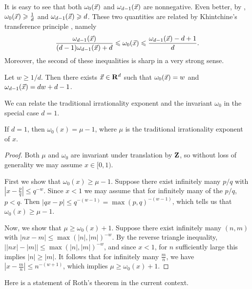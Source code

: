 It is easy to see that both $\omega_0(\vec{x})$ and $\omega_{d-1}(\vec{x})$ are 
nonnegative. Even better, by \cite[Th.~2 Cor]{laurent-2009}, 
$\omega_0(\vec{x}) \geqslant \frac 1 d$ and $\omega_{d-1}(\vec{x}) \geqslant d$. 
These two quantities are related by Khintchine's transference 
principle \cite[Th.~2]{laurent-2009}, namely 
\[
	\frac{\omega_{d-1}(\vec{x})}{(d-1) \omega_{d-1}(\vec{x})+d} \leqslant \omega_0(\vec{x}) \leqslant \frac{\omega_{d-1}(\vec{x})-d+1}{d} .
\]
Moreover, the second of these inequalities is sharp in a very strong sense. 

\begin{theorem}\label{thm:jarnik}
Let $w\geqslant 1/d$. Then there exists $\vec{x}\in \mathbf{R}^d$ such that 
$\omega_0(\vec{x})=w$ and $\omega_{d-1}(\vec{x}) = d w+d-1$. 
\end{theorem}

We can relate the traditional irrationality exponent and the invariant 
$\omega_0$ in the special case $d = 1$. 

\begin{theorem}\label{thm:omega-irrationality}
If $d=1$, then $\omega_0(x) = \mu-1$, where $\mu$ is the 
traditional irrationality exponent of $x$. 
\end{theorem}
\begin{proof}
Both $\mu$ and $\omega_0$ are invariant under translation by $\mathbf{Z}$, so without 
loss of generality we may assume $x\in [0,1)$. 

First we show that $\omega_0(x)\geqslant \mu-1$. Suppose there exist infinitely 
many $p/q$ with $\left| x - \frac p q\right| \leqslant q^{-w}$. Since $x<1$ we 
may assume that for infinitely many of the $p/q$, $p<q$. Then 
$| q x - p| \leqslant q^{-(w - 1)} = \max(p,q)^{-(w-1)}$, which tells us that 
$\omega_0(x) \geqslant \mu - 1$. 

Now, we show that $\mu \geqslant \omega_0(x) + 1$. Suppose there exist 
infinitely many $(n,m)$ with $|n x - m| \leqslant \max(|n|,|m|)^{-w}$. By the 
reverse triangle inequality, 
$\left| |n x| - |m|\right| \leqslant \max(|n|,|m|)^{-w}$, and since 
$x<1$, for $n$ sufficiently large this implies $|n| \geqslant |m|$. It follows 
that for infinitely many $\frac m n$, we have 
$\left| x - \frac m n\right| \leqslant n^{-(w + 1)}$, which implies 
$\mu \geqslant \omega_0(x) + 1$. 
\end{proof}

Here is a statement of Roth's theorem in the current context. 

